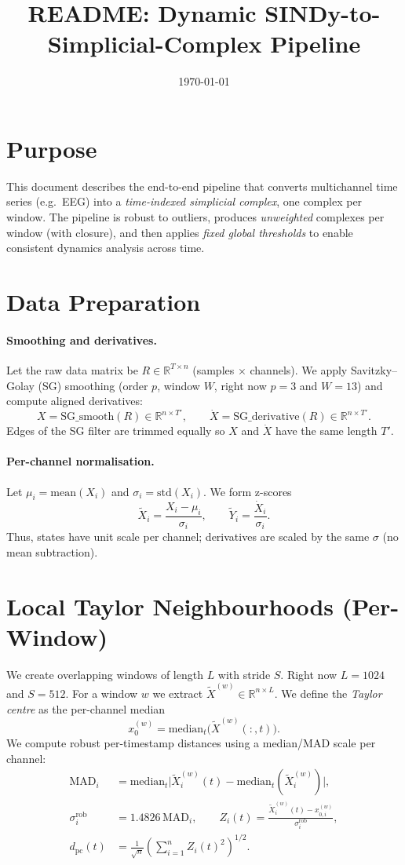 \documentclass[11pt]{article}
\title{README: Dynamic SINDy-to-Simplicial-Complex Pipeline}
\author{}
\date{\today}
\begin{document}
\maketitle

\section*{Purpose}
This document describes the end-to-end pipeline that converts multichannel time series (e.g.\ EEG) into a \emph{time-indexed simplicial complex}, one complex per window. The pipeline is robust to outliers, produces \emph{unweighted} complexes per window (with closure), and then applies \emph{fixed global thresholds} to enable consistent dynamics analysis across time.

\section{Data Preparation}
\paragraph{Smoothing and derivatives.}
Let the raw data matrix be $R \in \mathbb{R}^{T\times n}$ (samples $\times$ channels). 
We apply Savitzky--Golay (SG) smoothing (order \(p\), window \(W\), right now $p=3$ and $W=13$) and compute aligned derivatives:
\[
X = \mathrm{SG\_smooth}(R) \in \mathbb{R}^{n\times T'},\qquad
\dot X = \mathrm{SG\_derivative}(R) \in \mathbb{R}^{n\times T'}.
\]
Edges of the SG filter are trimmed equally so \(X\) and \(\dot X\) have the same length \(T'\). 

\paragraph{Per-channel normalisation.}
Let \(\mu_i = \mathrm{mean}(X_i)\) and \(\sigma_i = \mathrm{std}(X_i)\). We form z-scores
\[
\tilde X_i = \frac{X_i - \mu_i}{\sigma_i}, \qquad \tilde Y_i = \frac{\dot X_i}{\sigma_i}.
\]
Thus, states have unit scale per channel; derivatives are scaled by the same \(\sigma\) (no mean subtraction).

\section{Local Taylor Neighbourhoods (Per-Window)}
We create overlapping windows of length \(L\) with stride \(S\). Right now $L=1024$ and $S=512$. For a window \(w\) we extract \(\tilde X^{(w)} \in \mathbb{R}^{n\times L}\).
We define the \emph{Taylor centre} as the per-channel median
\[
x_0^{(w)} = \mathrm{median}_t\big(\tilde X^{(w)}(:,t)\big).
\]
We compute robust per-timestamp distances using a median/MAD scale per channel:
\begin{align*}
\mathrm{MAD}_i &= \mathrm{median}_t\big| \tilde X^{(w)}_i(t) - \mathrm{median}_t(\tilde X^{(w)}_i)\big|,\\
\sigma^{\mathrm{rob}}_i &= 1.4826\,\mathrm{MAD}_i,\qquad
Z_i(t) = \frac{\tilde X^{(w)}_i(t)-x_{0,i}^{(w)}}{\sigma^{\mathrm{rob}}_i},\\
d_{\mathrm{pc}}(t) &= \frac{1}{\sqrt{n}}\left(\sum_{i=1}^n Z_i(t)^2\right)^{1/2}.
\end{align*}
\end{document}
